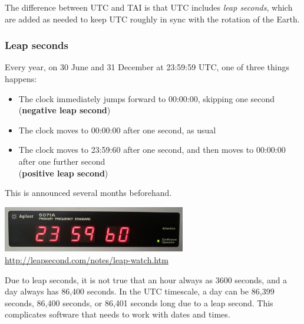 \label{l:utc}


The difference between UTC and TAI is that UTC includes \emph{leap seconds}, which are added as needed to keep UTC roughly in sync with the rotation of the Earth.

\begin{frame}
    \label{s:leap-seconds}
    \frametitle{Leap seconds}
    Every year, on 30 June and 31 December at 23:59:59 UTC, one of three things happens:
    \begin{itemize}
        \item The clock immediately jumps forward to 00:00:00, skipping one second (\textbf{negative leap second})
        \item The clock moves to 00:00:00 after one second, as usual
        \item The clock moves to 23:59:60 after one second, and then moves to 00:00:00 after one further second\\
            (\textbf{positive leap second})
    \end{itemize}
    This is announced several months beforehand.
    \begin{center}
        \includegraphics[width=8cm]{images/leap-second.jpg}
        \scriptsize\url{http://leapsecond.com/notes/leap-watch.htm}
    \end{center}
\end{frame}
\label{l:leap-seconds}

Due to leap seconds, it is not true that an hour always as 3600 seconds, and a day always has 86,400 seconds.
In the UTC timescale, a day can be 86,399 seconds, 86,400 seconds, or 86,401 seconds long due to a leap second.
This complicates software that needs to work with dates and times.

